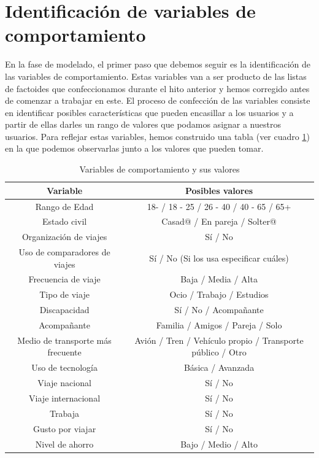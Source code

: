 \section{Identificación de variables de comportamiento}
En la fase de modelado, el primer paso que debemos seguir es la identificación de las variables de comportamiento. Estas variables van a ser producto de las listas de factoides que confeccionamos durante el hito anterior y hemos corregido antes de comenzar a trabajar en este. El proceso de confección de las variables consiste en identificar posibles características que pueden encasillar a los usuarios y a partir de ellas darles un rango de valores que podamos asignar a nuestros usuarios. Para reflejar estas variables, hemos construido una tabla (ver cuadro \ref{table:variables-comportamiento}) en la que podemos observarlas junto a los valores que pueden tomar.
\begin{table}[h]
    \centering
    \begin{tabular}{|c|c|}
        \hline
        \textbf{Variable} & \textbf{Posibles valores} \\ \hline
        Rango de Edad & 18- / 18 - 25 / 26 - 40 / 40 - 65 / 65+ \\ \hline
        Estado civil & Casad@ / En pareja / Solter@ \\ \hline
        Organización de viajes & Sí / No \\ \hline
        Uso de comparadores de viajes & Sí / No (Si los usa especificar cuáles) \\ \hline
        Frecuencia de viaje & Baja / Media / Alta \\ \hline
        Tipo de viaje & Ocio / Trabajo / Estudios \\ \hline
        Discapacidad & Sí / No / Acompañante \\ \hline
        Acompañante & Familia / Amigos / Pareja / Solo \\ \hline
        Medio de transporte más frecuente & Avión / Tren / Vehículo propio / Transporte público / Otro \\ \hline
        Uso de tecnología & Básica / Avanzada \\ \hline
        Viaje nacional & Sí / No \\ \hline
        Viaje internacional & Sí / No \\ \hline
        Trabaja & Sí / No \\ \hline
        Gusto por viajar & Sí / No \\ \hline
        Nivel de ahorro & Bajo / Medio / Alto \\ \hline
    \end{tabular}
    \caption{Variables de comportamiento y sus valores}
    \label{table:variables-comportamiento}
\end{table}


